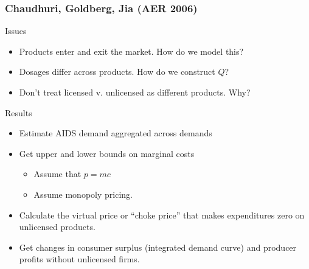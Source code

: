 \documentclass[xcolor=pdftex,dvipsnames,table,mathserif,aspectratio=169]{beamer}
\begin{document}
\begin{frame}
\frametitle{Chaudhuri, Goldberg, Jia (AER 2006)}
Issues
 \begin{itemize}
\item Products enter and exit the market. How do we model this?
\item Dosages differ across products. How do we construct $Q$?
\item Don't treat licensed v. unlicensed as different products. Why?
\end{itemize}
Results
 \begin{itemize}
\item Estimate AIDS demand aggregated across demands
\item Get upper and lower bounds on marginal costs
\begin{itemize}
\item Assume that $p=mc$
\item Assume monopoly pricing.
\end{itemize}
\item Calculate the \alert{virtual price} or ``choke price'' that makes expenditures zero on unlicensed products.
\item Get changes in consumer surplus (integrated demand curve) and producer profits without unlicensed firms.
\end{itemize}
\end{frame} 
\end{document}
